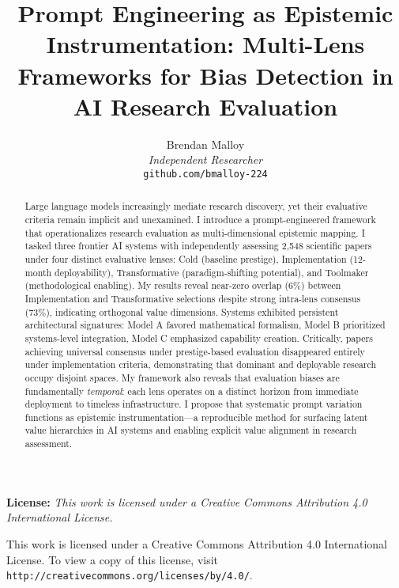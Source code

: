 \documentclass{article}
\begin{document}
\title{Prompt Engineering as Epistemic Instrumentation: Multi-Lens Frameworks for Bias Detection in AI Research Evaluation}

\author{Brendan Malloy\\
\textit{Independent Researcher}\\
\texttt{github.com/bmalloy-224}}

\maketitle

\begin{abstract}
Large language models increasingly mediate research discovery, yet their evaluative criteria remain implicit and unexamined. I introduce a prompt-engineered framework that operationalizes research evaluation as multi-dimensional epistemic mapping. I tasked three frontier AI systems with independently assessing 2,548 scientific papers under four distinct evaluative lenses: Cold (baseline prestige), Implementation (12-month deployability), Transformative (paradigm-shifting potential), and Toolmaker (methodological enabling). My results reveal near-zero overlap (6\%) between Implementation and Transformative selections despite strong intra-lens consensus (73\%), indicating orthogonal value dimensions. Systems exhibited persistent architectural signatures: Model A favored mathematical formalism, Model B prioritized systems-level integration, Model C emphasized capability creation. Critically, papers achieving universal consensus under prestige-based evaluation disappeared entirely under implementation criteria, demonstrating that dominant and deployable research occupy disjoint spaces. My framework also reveals that evaluation biases are fundamentally \textit{temporal}: each lens operates on a distinct horizon from immediate deployment to timeless infrastructure. I propose that systematic prompt variation functions as epistemic instrumentation—a reproducible method for surfacing latent value hierarchies in AI systems and enabling explicit value alignment in research assessment.
\end{abstract}

\textbf{License:} \textit{This work is licensed under a Creative Commons Attribution 4.0 International License.}

\begin{center}
\small
This work is licensed under a Creative Commons Attribution 4.0 International License. 
To view a copy of this license, visit \texttt{http://creativecommons.org/licenses/by/4.0/}.
\end{center}
\end{document}
